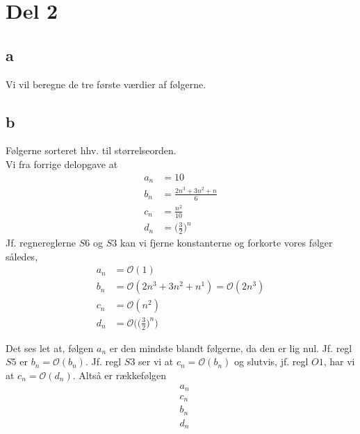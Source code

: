 \documentclass[a4paper]{article}
\begin{document}
\section*{Del 2}
\subsection*{a} %
\label{sub:a}
Vi vil beregne de tre første værdier af følgerne.\\


\subsection*{b} %
\label{sub:b}
Følgerne sorteret hhv. til størrelseorden.\\
Vi fra forrige delopgave at 
\begin{align*}
a_n &= 10 \\
b_n &= \frac{2n^3+3n^2+n}{6} \\
c_n &= \frac{n^2}{10} \\
d_n &= \Big(\frac{3}{2}\Big)^n
\end{align*}
Jf. regnereglerne $S6$ og $S3$ kan vi fjerne konstanterne og forkorte vores følger således,
\begin{align*}
a_n &= \mathcal{O}(1)\\
b_n &= \mathcal{O}(2n^3+3n^2+n^1) = \mathcal{O}(2n^3)\\
c_n &= \mathcal{O}(n^2) \\
d_n &= \mathcal{O}\Big(\Big(\frac{3}{2}\Big)^n\Big)
\end{align*}

Det ses let at, følgen $a_n$ er den mindste blandt følgerne, da den er lig nul. Jf. regl $S5$ er $b_n = \mathcal{O}(b_n)$. Jf. regl $S3$ ser vi at $c_n = \mathcal{O}(b_n)$ og slutvis, jf. regl $O1$, har vi at $c_n = \mathcal{O}(d_n)$. Altså er rækkefølgen
\begin{align*}
&a_n \\
&c_n \\
&b_n \\
&d_n 
\end{align*}
\end{document}
